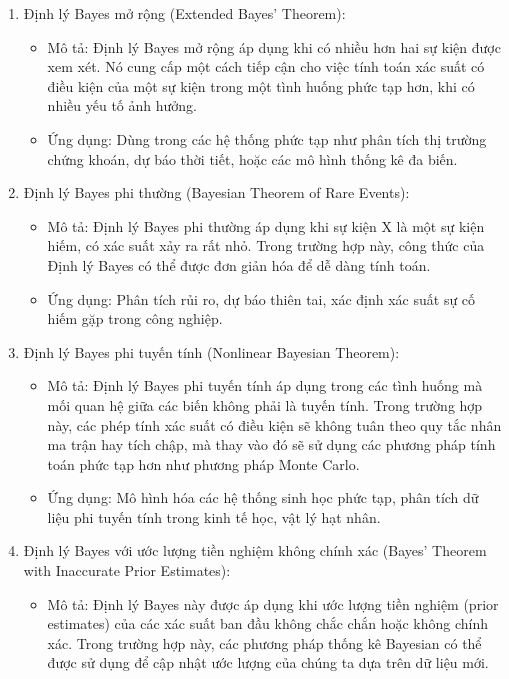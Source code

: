 \begin{itemize}
\begin{enumerate}
        \item Định lý Bayes mở rộng (Extended Bayes' Theorem):
        \begin{itemize}
            \item Mô tả: Định lý Bayes mở rộng áp dụng khi có nhiều hơn hai sự kiện được xem xét. Nó cung cấp một cách tiếp cận cho việc tính toán xác suất có điều kiện của một sự kiện trong một tình huống phức tạp hơn, khi có nhiều yếu tố ảnh hưởng.
            \item Ứng dụng: Dùng trong các hệ thống phức tạp như phân tích thị trường chứng khoán, dự báo thời tiết, hoặc các mô hình thống kê đa biến.
        \end{itemize}
        \item Định lý Bayes phi thường (Bayesian Theorem of Rare Events):
        \begin{itemize}
            \item Mô tả: Định lý Bayes phi thường áp dụng khi sự kiện X là một sự kiện hiếm, có xác suất xảy ra rất nhỏ. Trong trường hợp này, công thức của Định lý Bayes có thể được đơn giản hóa để dễ dàng tính toán.
            \item Ứng dụng: Phân tích rủi ro, dự báo thiên tai, xác định xác suất sự cố hiếm gặp trong công nghiệp.
        \end{itemize}
        \clearpage
        \item Định lý Bayes phi tuyến tính (Nonlinear Bayesian Theorem):
        \begin{itemize}
            \item Mô tả: Định lý Bayes phi tuyến tính áp dụng trong các tình huống mà mối quan hệ giữa các biến không phải là tuyến tính. Trong trường hợp này, các phép tính xác suất có điều kiện sẽ không tuân theo quy tắc nhân ma trận hay tích chập, mà thay vào đó sẽ sử dụng các phương pháp tính toán phức tạp hơn như phương pháp Monte Carlo.
            \item Ứng dụng: Mô hình hóa các hệ thống sinh học phức tạp, phân tích dữ liệu phi tuyến tính trong kinh tế học, vật lý hạt nhân.
        \end{itemize}
        \item Định lý Bayes với ước lượng tiền nghiệm không chính xác (Bayes' Theorem with Inaccurate Prior Estimates):
        \begin{itemize}
            \item Mô tả: Định lý Bayes này được áp dụng khi ước lượng tiền nghiệm (prior estimates) của các xác suất ban đầu không chắc chắn hoặc không chính xác. Trong trường hợp này, các phương pháp thống kê Bayesian có thể được sử dụng để cập nhật ước lượng của chúng ta dựa trên dữ liệu mới.

\end{itemize}
\end{enumerate}
\end{itemize}
